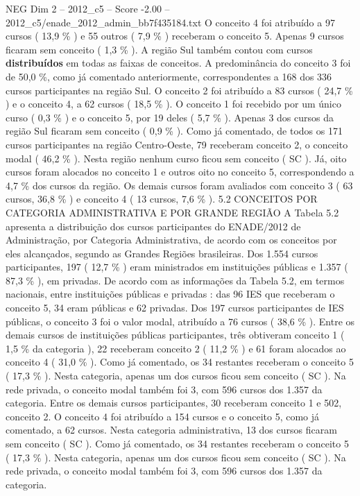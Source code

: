 \begin{textsample}{NEG Dim 2 – 2012\_c5 – Score -2.00 – 2012\_c5/enade\_2012\_admin\_bb7f435184.txt}
O conceito 4 foi atribuído a 97 cursos ( 13,9 \% ) e 55 outros ( 7,9 \% ) receberam o conceito 5.
Apenas 9 cursos ficaram sem conceito ( 1,3 \% ).
A região Sul também contou com cursos \textbf{distribuídos} em todas as faixas de conceitos.
A predominância do conceito 3 foi de 50,0 \%, como já comentado anteriormente, correspondentes a 168 dos 336 cursos participantes na região Sul.
O conceito 2 foi atribuído a 83 cursos ( 24,7 \% ) e o conceito 4, a 62 cursos ( 18,5 \% ).
O conceito 1 foi recebido por um único curso ( 0,3 \% ) e o conceito 5, por 19 deles ( 5,7 \% ).
Apenas 3 dos cursos da região Sul ficaram sem conceito ( 0,9 \% ).
Como já comentado, de todos os 171 cursos participantes na região Centro-Oeste, 79 receberam conceito 2, o conceito modal ( 46,2 \% ).
Nesta região nenhum curso ficou sem conceito ( SC ).
Já, oito cursos foram alocados no conceito 1 e outros oito no conceito 5, correspondendo a 4,7 \% dos cursos da região.
Os demais cursos foram avaliados com conceito 3 ( 63 cursos, 36,8 \% ) e conceito 4 ( 13 cursos, 7,6 \% ). 5.2 CONCEITOS POR CATEGORIA ADMINISTRATIVA E POR GRANDE REGIÃO A Tabela 5.2 apresenta a distribuição dos cursos participantes do ENADE/2012 de Administração, por Categoria Administrativa, de acordo com os conceitos por eles alcançados, segundo as Grandes Regiões brasileiras.
Dos 1.554 cursos participantes, 197 ( 12,7 \% ) eram ministrados em instituições públicas e 1.357 ( 87,3 \% ), em privadas.
De acordo com as informações da Tabela 5.2, em termos nacionais, entre instituições públicas e privadas : das 96 IES que receberam o conceito 5, 34 eram públicas e 62 privadas.
Dos 197 cursos participantes de IES públicas, o conceito 3 foi o valor modal, atribuído a 76 cursos ( 38,6 \% ).
Entre os demais cursos de instituições públicas participantes, três obtiveram conceito 1 ( 1,5 \% da categoria ), 22 receberam conceito 2 ( 11,2 \% ) e 61 foram alocados ao conceito 4 ( 31,0 \% ).
Como já comentado, os 34 restantes receberam o conceito 5 ( 17,3 \% ).
Nesta categoria, apenas um dos cursos ficou sem conceito ( SC ).
Na rede privada, o conceito modal também foi 3, com 596 cursos dos 1.357 da categoria.
Entre os demais cursos participantes, 30 receberam conceito 1 e 502, conceito 2.
O conceito 4 foi atribuído a 154 cursos e o conceito 5, como já comentado, a 62 cursos.
Nesta categoria administrativa, 13 dos cursos ficaram sem conceito ( SC ).
Como já comentado, os 34 restantes receberam o conceito 5 ( 17,3 \% ).
Nesta categoria, apenas um dos cursos ficou sem conceito ( SC ).
Na rede privada, o conceito modal também foi 3, com 596 cursos dos 1.357 da categoria.

\end{textsample}
